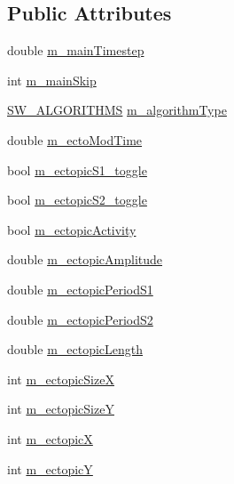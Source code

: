 \subsection*{Public Attributes}
\begin{DoxyCompactItemize}
\item 
double \hyperlink{classatrial_parameters_a0fc87681256f95d4354e128ff5cacf84}{m\+\_\+main\+Timestep}
\item 
int \hyperlink{classatrial_parameters_a8ff21c69a731af1992ad8f5f39deec96}{m\+\_\+main\+Skip}
\item 
\hyperlink{heart_defines_8h_ae0e356ca8deebb30aca0cd91e0cbd46c}{S\+W\+\_\+\+A\+L\+G\+O\+R\+I\+T\+H\+M\+S} \hyperlink{classatrial_parameters_af7a2c1518dfbdaaec6c3dd4d6d0883d9}{m\+\_\+algorithm\+Type}
\item 
double \hyperlink{classatrial_parameters_ac820bd58444854634cc58275037125e8}{m\+\_\+ecto\+Mod\+Time}
\item 
bool \hyperlink{classatrial_parameters_a9e4bac6934ba9adb8b1316df2ec56511}{m\+\_\+ectopic\+S1\+\_\+toggle}
\item 
bool \hyperlink{classatrial_parameters_a6abb9ccfeef719f0bcb6e69b92c76404}{m\+\_\+ectopic\+S2\+\_\+toggle}
\item 
bool \hyperlink{classatrial_parameters_a9fa3baf0ea436a1f91e8569c9c35b083}{m\+\_\+ectopic\+Activity}
\item 
double \hyperlink{classatrial_parameters_a734cc1920e198bb8eca851f7e8e1433b}{m\+\_\+ectopic\+Amplitude}
\item 
double \hyperlink{classatrial_parameters_a99ef346837d7a634a65fb2d78da439e2}{m\+\_\+ectopic\+Period\+S1}
\item 
double \hyperlink{classatrial_parameters_a416c2504a528df3b487faf18073db879}{m\+\_\+ectopic\+Period\+S2}
\item 
double \hyperlink{classatrial_parameters_a6b5224ecf713da2caf0163886372d9e3}{m\+\_\+ectopic\+Length}
\item 
int \hyperlink{classatrial_parameters_ad444b3bb241bf6572517124e5b7a1f3e}{m\+\_\+ectopic\+Size\+X}
\item 
int \hyperlink{classatrial_parameters_a677c6a961d3ac9af53d08f0ee2319172}{m\+\_\+ectopic\+Size\+Y}
\item 
int \hyperlink{classatrial_parameters_a229fe07e61fa0ed07460a1bb7363b19d}{m\+\_\+ectopic\+X}
\item 
int \hyperlink{classatrial_parameters_a7ce820843b65fc9f147ca86d814e9166}{m\+\_\+ectopic\+Y}
\item 

\end{DoxyCompactItemize}
